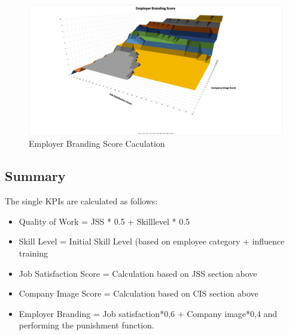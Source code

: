 \begin{figure}
	\centering
	\includegraphics[width=12.5cm]{images/EBS.jpg}
	\caption{Employer Branding Score Caculation}
	\label{img:EBS}
\end{figure}

\subsection{Summary}

The single KPIs are calculated as follows: 
\begin{itemize}
\item Quality of Work = JSS * 0.5 + Skilllevel * 0.5
\item Skill Level = Initial Skill Level (based on employee category + influence training
\item Job Satisfaction Score = Calculation based on JSS section above
\item Company Image Score = Calculation based on CIS section above
\item Employer Branding = Job satisfaction*0,6 + Company image*0,4 and performing the punishment function. 
\end{itemize}